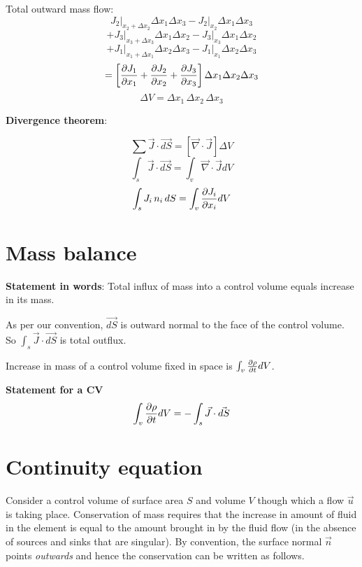 Total outward mass flow:
$$ \left. J_2 \right|_{x_2+\Delta x_2} \Delta x_1 \Delta x_3 - \left. J_2 \right|_{x_2} \Delta x_1 \Delta x_3 $$
$$ + \left. J_3 \right|_{x_3+\Delta x_3} \Delta x_1 \Delta x_2 - \left. J_3 \right|_{x_3} \Delta x_1 \Delta x_2 $$
$$ + \left. J_1 \right|_{x_1+\Delta x_1} \Delta x_2 \Delta x_3 - \left. J_1 \right|_{x_1} \Delta x_2 \Delta x_3 $$
$$ = \left[ { \partial J_1 \over \partial x_1} + { \partial J_2 \over \partial x_2} + { \partial J_3 \over \partial x_3}  \right] \Delta x_1 \Delta x_2 \Delta x_3 $$
$$ \Delta V = \Delta x_1 \, \Delta x_2 \, \Delta x_3 $$



{\bf Divergence theorem}:

$$ \sum{\vec{J} \cdot \vec{dS}} = \left[ \vec{\nabla} \cdot \vec{J} \right] \Delta V $$
$$ \int_{s}{\vec{J} \cdot \vec{dS}} = \int_{v}{\vec{\nabla} \cdot \vec{J} dV} $$ 
$$ \int_{s}{J_i \, n_i \, dS} = \int_{v}{ {\partial J_i \over \partial x_i} dV} $$ 


\section{Mass balance}

{\bf Statement in words}:
Total influx of mass into a control volume equals increase in its mass.

As per our convention, $\vec{dS}$ is outward normal to the face of the control volume. So $\int_{s}{\vec{J} \cdot \vec{dS}}$ is total outflux.

Increase in mass of a control volume fixed in space is $\int_{v}{{\partial \rho \over \partial t} dV}$.

{\bf Statement for a CV }
$$\int_{v}{{\partial \rho \over \partial t} dV} = - \int_{s}{\vec{J} \cdot \vec{dS}}$$



\section{Continuity equation}

Consider a control volume of surface area $S$ and volume $V$ though which a flow $\vec{u}$ is taking place. Conservation of mass requires that the increase in amount of fluid in the element is equal to the amount brought in by the fluid flow (in the absence of sources and sinks that are singular). By convention, the surface normal $\vec{n}$ points {\em outwards} and hence the conservation can be written as follows.

